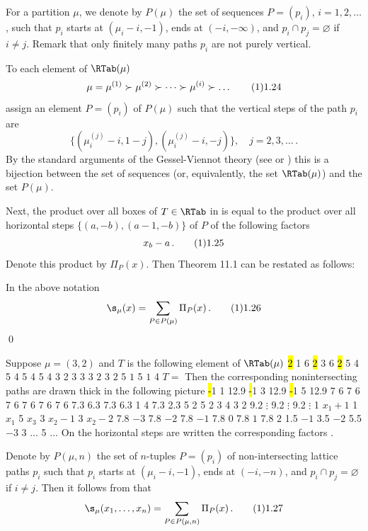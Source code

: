 For a partition $\mu$, we denote by $P(\mu)$ the set of sequences $P=(p_i)$,
$i=1,2,\dots$, such that $p_i$ starts at $(\mu_i-i,-1)$,
ends at $(-i,-\infty)$, and $p_i\cap p_j=
\varnothing$ if $i\ne j$. Remark that only finitely many
paths $p_i$ are not purely vertical.

To each element of $\RTab(\mu)$
$$
\mu=\mu^{(1)}\succ\mu^{(2)}\succ\dots\succ\mu^{(i)}\succ\dots \tag11.24
$$
assign an element $P=(p_i)$ of $P(\mu)$
such that the vertical steps of the path $p_i$ are 
$$
\{(\mu^{(j)}_i-i,1-j),
(\mu^{(j)}_i-i,-j)\},\quad j=2,3,\dots \,.
$$
By the standard arguments of the Gessel-Viennot theory (see \cite{GV} or
\cite{S}) 
this is a bijection between the set
of sequences  (or, equivalently, the set $\RTab(\mu)$)
and the set $P(\mu)$.

Next, the product over all boxes of $T\in\RTab$ in 
is equal to the product 
over all horizontal steps $\{(a,-b),(a-1,-b)\}$ of $P$
of the following factors
$$
x_b-a\,. \tag11.25
$$
Denote this product by $\Pi_P(x)$. Then Theorem 11.1 can be restated as
follows: 

 In the above notation
$$
\s_\mu(x)=\sum_{P\in P(\mu)} \Pi_P(x)\,. \tag11.26
$$
\qed
\endproclaim 

Suppose $\mu=(3,2)$ and $T$ is the following 
element of $\RTab(\mu)$
 {} 
{
\hl 2 1 6
\hl 2 3 6
\hl 2 5 4
 5 4
 5 4
 5 4
 3 2
 3 {$3$}
 3 {$2$}
 3 {$2$}
 5 {$1$}
 5 {$1$}
 4 {$T=$}
}
\endpicture
\noindent
Then the corresponding nonintersecting paths are drawn
thick in the following picture
 {}
{
\hl -1 1 12.9
\hl -1 3 12.9
\hl -1 5 12.9
%
 7 6
 7 6
 7 6
 7 6
 7 6
 7 6
%
 7.3 6.3
 7.3 6.3
 1 4
%
 7.3 2.3
 5 2
 5 2
 3 4
 3 2
%
 9.2 {$\vdots$}
 9.2 {$\vdots$}
 9.2 {$\vdots$}
%
 1 {$\scriptstyle{x_1+1}$} 
 1 {$\scriptstyle{x_1}$} 
 5 {$\scriptstyle{x_3}$} 
 3 {$\scriptstyle{x_2-1}$} 
 3 {$\scriptstyle{x_2-2}$} 
%
 7.8 {$-3$}
 7.8 {$-2$}
 7.8 {$-1$}
 7.8 {$0$}
 7.8 {$1$}
 7.8 {$2$}
%
 1.5 {$-1$}
 3.5 {$-2$}
 5.5 {$-3$}
%
 3 {$\hdots$}
 5 {$\hdots$}
}
\endpicture
\noindent 
On the horizontal steps are written the corresponding
factors .
\endexample

Denote by $P(\mu,n)$ 
the set of $n$-tuples $P=(p_i)$ of non-intersecting
lattice paths $p_i$ such that $p_i$ starts at $(\mu_i-i,-1)$,
ends at $(-i,-n)$, and $p_i\cap p_j=
\varnothing$ if $i\ne j$. Then it follows from  
that
$$
\s_\mu(x_1,\dots,x_n)=\sum_{P\in P(\mu,n)} \Pi_P(x)\,. \tag11.27
$$

